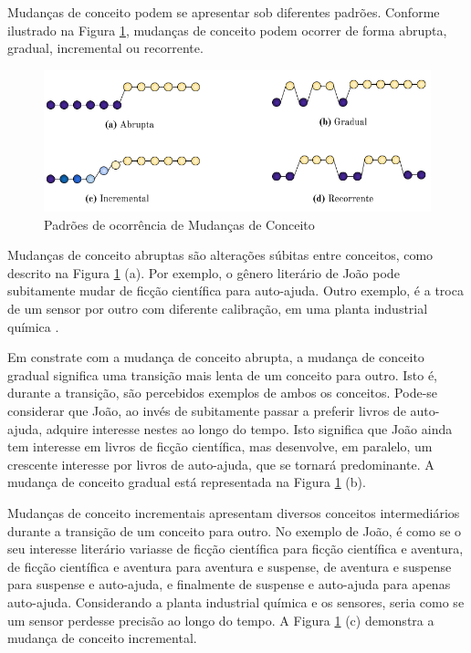 \documentclass[qual, classic, a4paper]{ufbathesis}
\begin{document}
Mudanças de conceito podem se apresentar sob diferentes padrões.
Conforme ilustrado na Figura \ref{fig:concept_drift_patterns}, mudanças de conceito podem ocorrer de forma abrupta, gradual, incremental ou recorrente.
 
\begin{figure}[!ht]
\begin{center}
    \includegraphics[scale=0.80]{imagens/concept_drift_patterns.png}
    \caption{Padrões de ocorrência de Mudanças de Conceito}
    \label{fig:concept_drift_patterns}
\end{center}
\end{figure}

Mudanças de conceito abruptas são alterações súbitas entre conceitos, como descrito na Figura \ref{fig:concept_drift_patterns} (a).
Por exemplo, o gênero literário de João pode subitamente mudar de ficção científica para auto-ajuda.
Outro exemplo, é a troca de um sensor por outro com diferente calibração, em uma planta industrial química \cite{Gama:2014:SCD:2597757.2523813}. 

Em constrate com a mudança de conceito abrupta, a mudança de conceito gradual significa uma transição mais lenta de um conceito para outro.
Isto é, durante a transição, são percebidos exemplos de ambos os conceitos.
Pode-se considerar que João, ao invés de subitamente passar a preferir livros de auto-ajuda, adquire interesse nestes ao longo do tempo.
Isto significa que João ainda tem interesse em livros de ficção científica, mas desenvolve, em paralelo, um crescente interesse por livros de auto-ajuda, que se tornará predominante.
A mudança de conceito gradual está representada na Figura \ref{fig:concept_drift_patterns} (b).

Mudanças de conceito incrementais apresentam diversos conceitos intermediários durante a transição de um conceito para outro.
No exemplo de João, é como se o seu interesse literário variasse de ficção científica para ficção científica e aventura, 
de ficção científica e aventura para aventura e suspense, de aventura e suspense para suspense e auto-ajuda, e finalmente de suspense e auto-ajuda para apenas auto-ajuda.
Considerando a planta industrial química e os sensores, seria como se um sensor perdesse precisão ao longo do tempo. 
A Figura \ref{fig:concept_drift_patterns} (c) demonstra a mudança de conceito incremental. 
\end{document}
